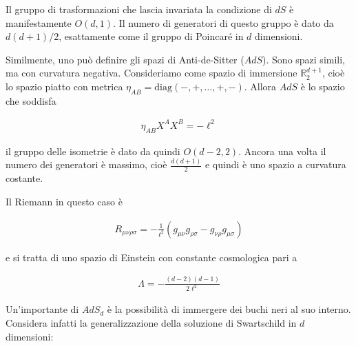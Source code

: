 \documentclass{report}
\begin{document}
Il gruppo di trasformazioni che lascia invariata la condizione di \(dS\) è manifestamente \(O(d, 1)\). Il numero di generatori di questo gruppo è dato da \(d(d+1)/2\), esattamente come il gruppo di Poincaré in \(d\) dimensioni. 


Similmente, uno può definire gli spazi di Anti-de-Sitter (\(AdS\)). Sono spazi simili, ma con curvatura negativa. Consideriamo come spazio di immersione \(\mathbb{R}^{d+1}_2\), cioè lo spazio piatto con metrica \(\eta_{AB} = \text{diag}(-, +, \ldots, +, -)\). Allora \(AdS\) è lo spazio che soddisfa 

\begin{align}
    \eta_{AB}X^A X^B = -\ell^2
\end{align}

il gruppo delle isometrie è dato da quindi \(O(d-2, 2)\). Ancora una volta il numero dei generatori è massimo, cioè \(\frac{d(d+1)}{2}\) e quindi è uno spazio a curvatura costante. 


Il Riemann in questo caso è 

    \begin{align}
        R_{\mu\nu\rho\sigma} = -\frac{1}{\ell^2}(g_{\mu\nu}g_{\rho\sigma} - g_{\nu\rho}g_{\mu\sigma})
    \end{align}

e si tratta di uno spazio di Einstein con constante cosmologica pari a 

\begin{align}
    \Lambda = -\frac{(d-2)(d-1)}{2\ell^2}
\end{align}

Un'importante di \(AdS_d\) è la possibilità di immergere dei buchi neri al suo interno. Considera infatti la generalizzazione della soluzione di Swartschild in \(d\) dimensioni: 
\end{document}
